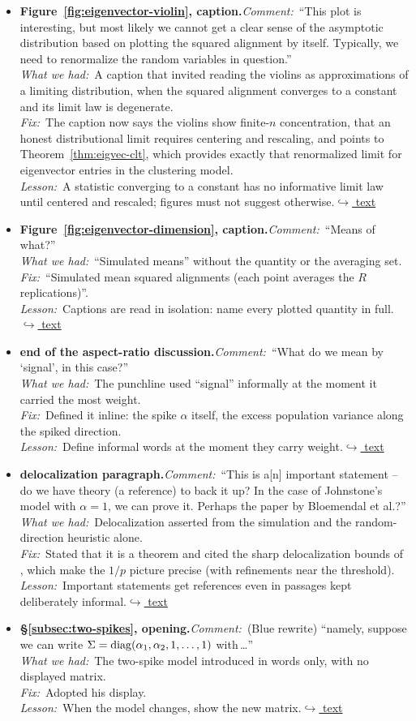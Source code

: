 \documentclass[12pt]{article}
\newcommand{\gdlogentry}[6]{%
  \item[\textcolor{thesisRev}{$\star$\,\ref{gdrev:#1}}]\hypertarget{gdlog:#1}{}%
  \textbf{#2.}\enspace\emph{Comment:}~#3\\
  \emph{What we had:}~#4\\
  \emph{Fix:}~#5\\
  \emph{Lesson:}~#6\enspace\hyperlink{gdtext:#1}{\textcolor{thesisLink}{$\hookrightarrow$ text}}}
\begin{document}
\begin{itemize}[leftmargin=2.4em,itemsep=0.55em]
\gdlogentry{r3-violin-renorm}{Figure~\ref{fig:eigenvector-violin}, caption}{``This plot is interesting, but most likely we cannot get a clear sense of the asymptotic distribution based on plotting the squared alignment by itself. Typically, we need to renormalize the random variables in question.''}{A caption that invited reading the violins as approximations of a limiting distribution, when the squared alignment converges to a constant and its limit law is degenerate.}{The caption now says the violins show finite-\(n\) concentration, that an honest distributional limit requires centering and rescaling, and points to Theorem~\ref{thm:eigvec-clt}, which provides exactly that renormalized limit for eigenvector entries in the clustering model.}{A statistic converging to a constant has no informative limit law until centered and rescaled; figures must not suggest otherwise.}

\gdlogentry{r3-means-caption}{Figure~\ref{fig:eigenvector-dimension}, caption}{``Means of what?''}{``Simulated means'' without the quantity or the averaging set.}{``Simulated mean squared alignments (each point averages the \(R\) replications)''.}{Captions are read in isolation: name every plotted quantity in full.}

\gdlogentry{r3-signal}{end of the aspect-ratio discussion}{``What do we mean by `signal', in this case?''}{The punchline used ``signal'' informally at the moment it carried the most weight.}{Defined it inline: the spike \(\alpha\) itself, the excess population variance along the spiked direction.}{Define informal words at the moment they carry weight.}

\gdlogentry{r3-deloc-ref}{delocalization paragraph}{``This is a[n] important statement -- do we have theory (a reference) to back it up? In the case of Johnstone's model with \(\alpha = 1\), we can prove it. Perhaps the paper by Bloemendal et al.?''}{Delocalization asserted from the simulation and the random-direction heuristic alone.}{Stated that it is a theorem and cited the sharp delocalization bounds of \citet{BloemendalKnowlesYauYin2016}, which make the \(1/p\) picture precise (with refinements near the threshold).}{Important statements get references even in passages kept deliberately informal.}

\gdlogentry{r3-two-spike-model}{\S\ref{subsec:two-spikes}, opening}{(Blue rewrite) ``namely, suppose we can write \(\Sigma = \operatorname{diag}(\alpha_1, \alpha_2, 1, \dots, 1)\) with\,\dots''}{The two-spike model introduced in words only, with no displayed matrix.}{Adopted his display.}{When the model changes, show the new matrix.}


\end{itemize}
\end{document}
